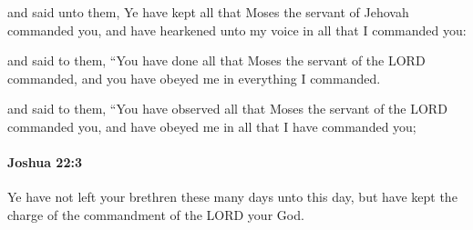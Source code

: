 			\begin{versebox}
					\item[BHS] 
					\item[ASV] and said unto them, Ye have kept all that Moses the servant of Jehovah commanded you, and have hearkened unto my voice in all that I commanded you:
					\item[NIV] and said to them, “You have done all that Moses the servant of the LORD commanded, and you have obeyed me in everything I commanded.
					\item[NRSV] and said to them, “You have observed all that Moses the servant of the LORD commanded you, and have obeyed me in all that I have commanded you;
			\end{versebox}

		\paragraph{Joshua 22:3} %
			\label{JOSHUA-22-3}

			Ye have not left your brethren these many days unto this day, but have kept the charge of the commandment of the LORD your God.

